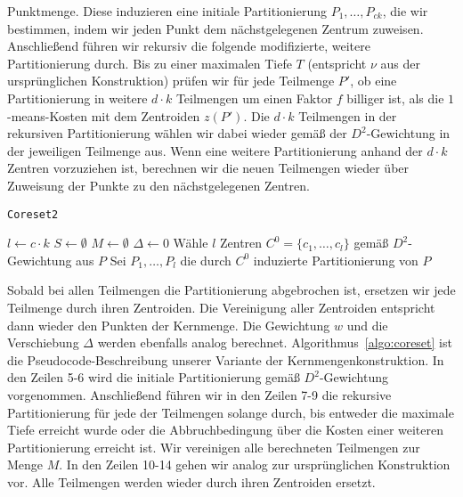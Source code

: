Punktmenge. Diese induzieren eine initiale Partitionierung $P_1, \dots, P_{ck}$, die wir bestimmen, indem wir jeden
Punkt dem nächstgelegenen Zentrum zuweisen. Anschließend führen wir rekursiv die folgende modifizierte, weitere Partitionierung
durch.
Bis zu einer maximalen Tiefe $T$ (entspricht $\nu$ aus der ursprünglichen Konstruktion) prüfen wir für jede
Teilmenge $P'$, ob eine Partitionierung in weitere $d \cdot k$ Teilmengen um einen Faktor $f$ billiger ist, als die
$1$-means-Kosten mit dem Zentroiden $z(P')$. Die $d \cdot k$ Teilmengen in der rekursiven Partitionierung wählen wir dabei
wieder gemäß der $D^2$-Gewichtung in der jeweiligen Teilmenge aus. Wenn eine weitere Partitionierung anhand der $d \cdot k$
Zentren vorzuziehen ist, berechnen wir die neuen Teilmengen wieder über Zuweisung der Punkte zu den nächstgelegenen Zentren.

\begin{algorithm}
\caption{\texttt{Coreset2}}
\label{algo:coreset}
	\DontPrintSemicolon
	
	\BlankLine
	
	$l \leftarrow c \cdot k$\;
	$S \leftarrow \emptyset$\;
	$M \leftarrow \emptyset$\;
	$\Delta \leftarrow 0$\;
	Wähle $l$ Zentren $C^0 = \{c_1, \dots, c_l\}$ gemäß $D^2$-Gewichtung aus $P$\;
	Sei $P_1, \dots, P_l$ die durch $C^0$ induzierte Partitionierung von $P$\;
\end{algorithm}
Sobald bei allen Teilmengen die Partitionierung abgebrochen ist, ersetzen wir jede Teilmenge durch ihren Zentroiden. Die
Vereinigung aller Zentroiden entspricht dann wieder den Punkten der Kernmenge. Die Gewichtung $w$ und die Verschiebung $\Delta$
werden ebenfalls analog berechnet.
\absatz
Algorithmus~\ref{algo:coreset} ist die Pseudocode-Beschreibung unserer Variante der Kernmengenkonstruktion. In den Zeilen
5-6 wird die initiale Partitionierung gemäß $D^2$-Gewichtung vorgenommen. Anschließend führen wir in den Zeilen 7-9 die
rekursive Partitionierung für jede der Teilmengen solange durch, bis entweder die maximale Tiefe erreicht wurde oder die
Abbruchbedingung über die Kosten einer weiteren Partitionierung erreicht ist. Wir vereinigen alle berechneten Teilmengen zur
Menge $M$. In den Zeilen 10-14 gehen wir analog zur ursprünglichen Konstruktion vor. Alle Teilmengen werden wieder durch ihren
Zentroiden ersetzt.


